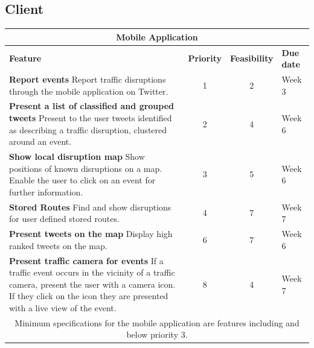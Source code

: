 \subsection{Client}

\begin{center}
\begin{tabular}{ | p{9cm} | c | c | p{1.8cm} | }
\hline
\multicolumn{4}{|c|}{\textbf{Mobile Application}} \\ \hline
\textbf{Feature} & \textbf{Priority} & \textbf{Feasibility} & \textbf{Due date} \\ \hline
\textbf{Report events}\newline
Report traffic disruptions through the mobile application on Twitter. & 1 & 2 & Week 3 \\ \hline
\textbf{Present a list of classified and grouped tweets}\newline
Present to the user tweets identified as describing a traffic disruption,
clustered around an event. & 2 & 4 & Week 6 \\ \hline
\textbf{Show local disruption map}\newline
Show positions of known disruptions on a map. Enable the user to click on an event for further information. & 3 & 5 & Week 6 \\ \hline
\textbf{Stored Routes}\newline
Find and show disruptions for user defined stored routes. & 4 & 7 & Week 7 \\ \hline \hline
\textbf{Present tweets on the map}\newline 
Display high ranked tweets on the map.& 6 & 7 & Week 6 \\ \hline 
\textbf{Present traffic camera for events}\newline
If a traffic event occurs in the vicinity of a traffic camera, present the user
with a camera icon. If they click on the icon they are presented with a live
view of the event. &  8 & 4 & Week 7 \\ \hline
\multicolumn{4}{|c|}{Minimum specifications for the mobile application are
features including and below priority 3.} \\ \hline
\end{tabular}
\end{center}
